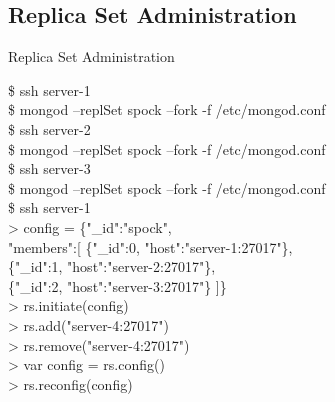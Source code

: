 \documentclass{beamer}
\begin{document}
\subsection{Replica Set Administration}
\begin{frame}{Replica Set Administration}
    \scriptsize
    \begin{Alms*}
    	\$ ssh server-1 \\
    	\$ mongod --replSet spock --fork -f /etc/mongod.conf \\
    	\$ ssh server-2 \\
    	\$ mongod --replSet spock --fork -f /etc/mongod.conf \\
    	\$ ssh server-3 \\
    	\$ mongod --replSet spock --fork -f /etc/mongod.conf \\
    	
    	\$ ssh server-1 \\
    	> config = \{"\_id":"spock", \\
    	"members":[\NI
    	\{"\_id":0, "host":"server-1:27017"\}, \\
    	\{"\_id":1, "host":"server-2:27017"\}, \\
    	\{"\_id":2, "host":"server-3:27017"\}
    	\ND]\} \\
    	> rs.initiate(config) \\
    	> rs.add("server-4:27017") \\
    	> rs.remove("server-4:27017") \\
    	> var config = rs.config() \\
    	> rs.reconfig(config)
    	
    \end{Alms*}
\end{frame}
\end{document}
